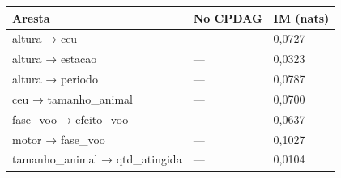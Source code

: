 \begin{tabular}{lll}
\toprule
Aresta & No CPDAG & IM (nats) \\
\midrule
altura → ceu & — & 0,0727 \\
altura → estacao & — & 0,0323 \\
altura → periodo & — & 0,0787 \\
ceu → tamanho\_animal & — & 0,0700 \\
fase\_voo → efeito\_voo & — & 0,0637 \\
motor → fase\_voo & — & 0,1027 \\
tamanho\_animal → qtd\_atingida & — & 0,0104 \\
\bottomrule
\end{tabular}
